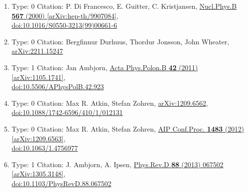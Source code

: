 \documentclass[a4paper,10pt]{article}
\begin{document}
\begin{enumerate}
\begin{enumerate}
  \item Type: 0 Citation: P. Di Francesco, E. Guitter, C. Kristjansen, \href{https://www.doi.org/10.1016/S0550-3213(99)00661-6}{Nucl.Phys.B {\bf 567} (2000) }  \href{https://arxiv.org/abs/hep-th/9907084}{[arXiv:hep-th/9907084]},\\\href{https://www.doi.org/10.1016/S0550-3213(99)00661-6}{doi:10.1016/S0550-3213(99)00661-6}
  \item Type: 0 Citation: Bergfinnur Durhuus, Thordur Jonsson, John Wheater, \href{https://arxiv.org/abs/2211.15247}{arXiv:2211.15247}
  \item Type: 1 Citation: Jan Ambjorn, \href{https://www.doi.org/10.5506/APhysPolB.42.923}{Acta Phys.Polon.B {\bf 42} (2011) }  \href{https://arxiv.org/abs/1105.1741}{[arXiv:1105.1741]},\\\href{https://www.doi.org/10.5506/APhysPolB.42.923}{doi:10.5506/APhysPolB.42.923}
  \item Type: 0 Citation: Max R. Atkin, Stefan Zohren, \href{https://arxiv.org/abs/1209.6562}{arXiv:1209.6562},\\\href{https://www.doi.org/10.1088/1742-6596/410/1/012131}{doi:10.1088/1742-6596/410/1/012131}
  \item Type: 0 Citation: Max R. Atkin, Stefan Zohren, \href{https://www.doi.org/10.1063/1.4756977}{AIP Conf.Proc. {\bf 1483} (2012) }  \href{https://arxiv.org/abs/1209.6563}{[arXiv:1209.6563]},\\\href{https://www.doi.org/10.1063/1.4756977}{doi:10.1063/1.4756977}
  \item Type: 1 Citation: J. Ambjorn, A. Ipsen, \href{https://www.doi.org/10.1103/PhysRevD.88.067502}{Phys.Rev.D {\bf 88} (2013) 067502}  \href{https://arxiv.org/abs/1305.3148}{[arXiv:1305.3148]},\\\href{https://www.doi.org/10.1103/PhysRevD.88.067502}{doi:10.1103/PhysRevD.88.067502}

\end{enumerate}
\end{enumerate}
\end{document}
